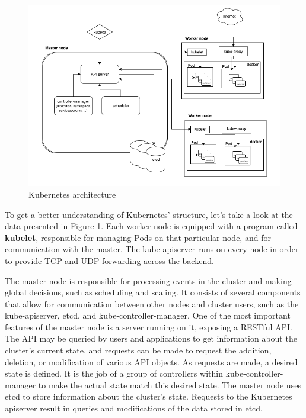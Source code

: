 \begin{figure}[!ht]
    \centering
    \includegraphics[width=1\textwidth, angle=0]{img/architecture.png}
    \caption{Kubernetes architecture~\cite{arch}}
    \label{fig:arch}
\end{figure}

To get a better understanding of Kubernetes' structure, let’s take a look at the data presented
in Figure \ref{fig:arch}. Each worker node is equipped with a program called \textbf{kubelet},
responsible for managing Pods on that particular node, and for communication with the master. The
kube-apiserver runs on every node in order to provide TCP and UDP forwarding across the backend.

The master node is responsible for processing events in the cluster and making global decisions,
such as scheduling and scaling. It consists of several components that allow for communication
between other nodes and cluster users, such as the kube-apiserver, etcd, and kube-controller-manager.
One of the most important features of the master node is a server running on it, exposing a RESTful
API. The API may be queried by users and applications to get information about the cluster’s current
state, and requests can be made to request the addition, deletion, or modification of various API
objects. As requests are made, a desired state is defined. It is the job of a group of controllers
within kube-controller-manager to make the actual state match this desired state. The master node
uses etcd to store information about the cluster’s state. Requests to the Kubernetes apiserver
result in queries and modifications of the data stored in etcd.

